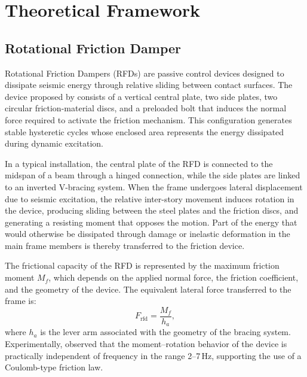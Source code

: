\documentclass[preprint,12pt,authoryear]{elsarticle}
\newcommand{\Mf}{M_{\!f}}                      %
\newcommand{\ha}{h_a}                          %
\begin{document}
\section{Theoretical Framework}
\label{sec:theory}

\subsection{Rotational Friction Damper}
\label{sec:theory:rfd}

Rotational Friction Dampers (RFDs) are passive control devices designed to
dissipate seismic energy through relative sliding between contact surfaces. The
device proposed by \citet{Mualla2002} consists of a vertical central plate, two
side plates, two circular friction-material discs, and a preloaded bolt that
induces the normal force required to activate the friction mechanism. This
configuration generates stable hysteretic cycles whose enclosed area represents
the energy dissipated during dynamic excitation.

In a typical installation, the central plate of the RFD is connected to the
midspan of a beam through a hinged connection, while the side plates are linked
to an inverted V-bracing system. When the frame undergoes lateral displacement
due to seismic excitation, the relative inter-story movement induces rotation in
the device, producing sliding between the steel plates and the friction discs, and
generating a resisting moment that opposes the motion. Part of the energy that
would otherwise be dissipated through damage or inelastic deformation in the main
frame members is thereby transferred to the friction device.

The frictional capacity of the RFD is represented by the maximum friction moment
$\Mf$, which depends on the applied normal force, the friction coefficient, and
the geometry of the device. The equivalent lateral force transferred to the frame
is:
\begin{equation}
    F_{\mathrm{rfd}} = \frac{\Mf}{\ha},
    \label{eq:Frfd}
\end{equation}
where $\ha$ is the lever arm associated with the geometry of the bracing system.
Experimentally, \citet{Mualla2002} observed that the moment--rotation behavior of
the device is practically independent of frequency in the range 2--7\,Hz,
supporting the use of a Coulomb-type friction law.
\end{document}
